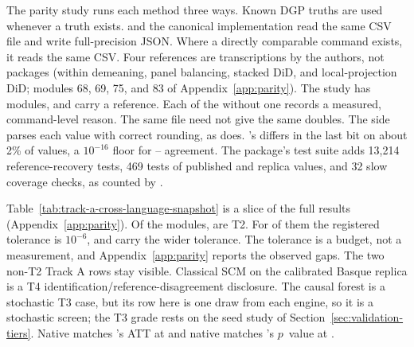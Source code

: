 The parity study runs each method three ways. Known DGP truths are used
whenever a truth exists. \statspai{} and the canonical 
implementation read the same  CSV file and write
full-precision JSON. Where a directly comparable  command
exists, it reads the same CSV. Four  references are transcriptions by the authors, not
packages (within demeaning, panel balancing, stacked DiD, and local-projection
DiD; modules 68, 69, 75, and 83 of Appendix~\ref{app:parity}). The study has \RParityModuleCount{} modules,
and \StataParityModuleCount{} carry a  reference. Each of
the \NoStataModuleCount{} without one records a measured, command-level
reason.
The same file need not give the same doubles. The  side
parses each value with correct rounding, as  does.
's  differs in the last bit on about 2\% of
values, a \(10^{-16}\) floor for -- agreement.
The package's test suite adds 13{,}214 reference-recovery tests, 469 tests
of published and replica values, and 32 slow coverage checks, as counted by
.

\begin{table}[!ht]
\centering\scriptsize

\caption{Representative parity rows. Every row is inside its registered
tolerance, \(10^{-6}\) unless the verdict says otherwise; the forest row is
a single draw from each engine, and the classical-SCM row is a disclosure
with no tolerance. ``Max rel. err.'' is the larger of the  and
 gaps. Data marked ``replica'' are calibrated replicas, so
their coefficients differ from Table~\ref{tab:headline-parity}.}
\label{tab:track-a-cross-language-snapshot}
\end{table}

Table~\ref{tab:track-a-cross-language-snapshot} is a slice of the full
results (Appendix~\ref{app:parity}). Of the \RParityModuleCount{} modules,
\RParityStrictCount{} are T2. For \RParityMachineCount{} of them the
registered tolerance is \(10^{-6}\), and \RParityIterativeCount{} carry the
wider tolerance. The tolerance is a budget, not a measurement, and
Appendix~\ref{app:parity} reports the observed gaps. The two non-T2 Track A rows
stay visible. Classical SCM on the calibrated Basque replica is a T4
identification/reference-disagreement disclosure. The causal forest is a
stochastic T3 case, but its row here is one draw from each engine, so it is a
stochastic screen; the T3 grade rests on the seed study of Section~\ref{sec:validation-tiers}. Native  matches
's ATT at \TrackASdidGap{} and native 
matches 's \(p\)~value at \TrackARddensityPGap{}.

